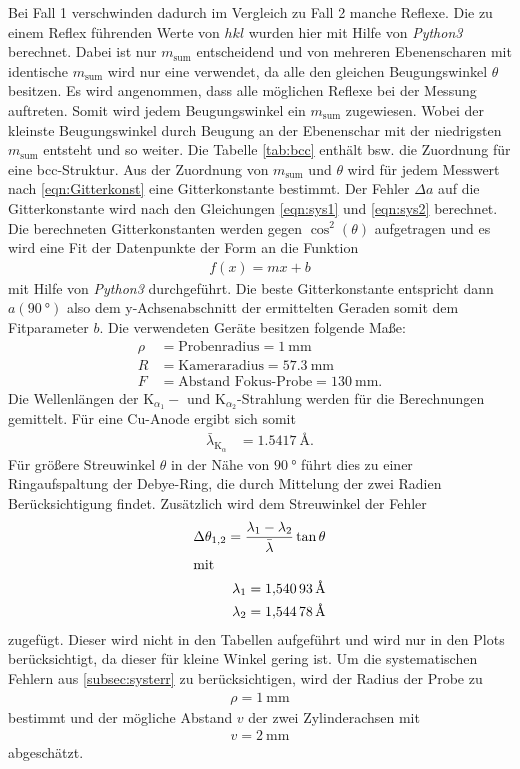 Bei Fall 1 verschwinden dadurch im Vergleich zu Fall 2 manche
Reflexe.
Die zu einem Reflex führenden Werte von $hkl$ wurden hier mit Hilfe von
\textit{Python3} berechnet. Dabei ist nur $m_{\mathrm{sum}}$ entscheidend
und von mehreren Ebenenscharen mit identische $m_{\mathrm{sum}}$ wird nur eine verwendet,
da alle den gleichen Beugungswinkel $\theta$ besitzen.
Es wird angenommen, dass alle möglichen Reflexe bei der Messung auftreten.
Somit wird jedem Beugungswinkel \theta ein $m_{\mathrm{sum}}$ zugewiesen.
Wobei der kleinste Beugungswinkel durch Beugung an der
Ebenenschar mit der niedrigsten $m_{\mathrm{sum}}$ entsteht und so weiter.
Die Tabelle \ref{tab:bcc} enthält bsw. die Zuordnung für eine bcc-Struktur.
Aus der Zuordnung von $m_{\mathrm{sum}}$ und $\theta$
wird für jedem Messwert nach \eqref{eqn:Gitterkonst}
eine Gitterkonstante bestimmt. Der Fehler $\Delta a$
auf die Gitterkonstante
wird nach den Gleichungen \eqref{eqn:sys1} und \eqref{eqn:sys2}
berechnet. Die berechneten Gitterkonstanten werden
gegen $\cos^2\left(\theta\right)$ aufgetragen und es wird
eine Fit der Datenpunkte der Form an die Funktion
\begin{align}
  f(x)= mx+b
\end{align}
mit Hilfe von \textit{Python3} durchgeführt.
Die beste Gitterkonstante entspricht dann $a(\SI{90}{\degree})$
also dem y-Achsenabschnitt der ermittelten Geraden somit dem Fitparameter $b$.
Die verwendeten Geräte besitzen folgende Maße:
\begin{align*}
  \rho &= \text{Probenradius} = \SI{1}{\milli\meter}\\
  R &= \text{Kameraradius} = \SI{57.3}{\milli\meter}\\
  F &= \text{Abstand Fokus-Probe} = \SI{130}{\milli\meter}.
\end{align*}
Die Wellenlängen der
$\mathrm{K}_{\alpha_1}-$
und $\mathrm{K}_{\alpha_2}$-Strahlung
werden für die Berechnungen gemittelt.
Für eine Cu-Anode ergibt sich somit
\begin{align*}
  \bar{\lambda}_{\mathrm{K}_\alpha} &= \SI{1,5417}{\angstrom}.
\end{align*}
Für größere Streuwinkel $\theta$ in der
Nähe von $\SI{90}{\degree}$
führt dies zu einer Ringaufspaltung
der Debye-Ring, die durch Mittelung der zwei Radien
Berücksichtigung findet. Zusätzlich
wird dem Streuwinkel \theta der Fehler
\begin{align*}
  \Delta\theta_{1,2} = \frac{\lambda_1 - \lambda_2}{\bar{\lambda}}\tan\theta\\
\intertext{mit}
 \lambda_1=\SI{1,54093}{\angstrom}\\
 \lambda_2=\SI{1,54478}{\angstrom}
\end{align*}
zugefügt. Dieser wird nicht in den Tabellen aufgeführt
und wird nur in den Plots berücksichtigt, da dieser für kleine Winkel gering ist.
Um die systematischen Fehlern aus \ref{subsec:systerr}
zu berücksichtigen, wird der Radius der Probe zu
\begin{align*}
\rho = \SI{1}{\milli\meter}
\end{align*}
bestimmt und der mögliche Abstand $v$
der zwei Zylinderachsen
mit \begin{align*}
v = \SI{2}{\milli\meter}
\end{align*}
abgeschätzt.
\newpage
